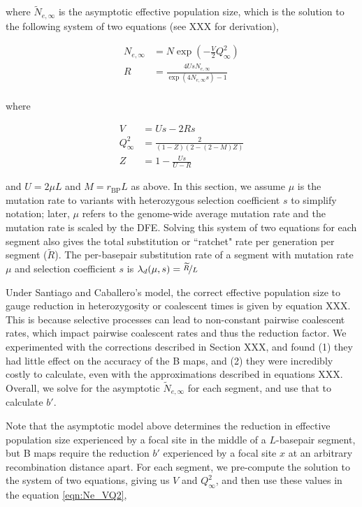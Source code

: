 \documentclass[11pt]{article}
\begin{document}
where $\widetilde{N}_{e,\infty}$ is the asymptotic effective population size,
which is the solution to the following system of two equations (see XXX for
derivation),

\begin{align}
    {N}_{e,\infty} &= N \exp \left( -\frac{V}{2} Q_\infty^2 \right) \label{eqn:Ne_VQ2} \\
  {R} &= \frac{4 U s N_{e,\infty}}{\exp(4 N_{e,\infty} s)-1} \nonumber \\
\end{align}

where 

\begin{align}
  V &= U s - 2 {R} s \\
  Q_\infty^2 &= \frac{2}{(1-Z)(2-(2-M)Z)} \\
  Z &= 1 - \frac{Us}{U-{R}}
\end{align}

and $U = 2\mu L$ and $M = r_\text{BP} L$ as above. In this section, we assume
$\mu$ is the mutation rate to variants with heterozygous selection coefficient
$s$ to simplify notation; later, $\mu$ refers to the genome-wide average
mutation rate and the mutation rate is scaled by the DFE. Solving this system
of two equations for each segment also gives the total substitution or
``ratchet" rate per generation per segment ($\widetilde{R}$). The per-basepair
substitution rate of a segment with mutation rate $\mu$ and selection
coefficient $s$ is $\lambda_d(\mu, s) = \nicefrac{\widetilde{R}}{L}$

Under Santiago and Caballero's model, the correct effective population size to
gauge reduction in heterozygosity or coalescent times is given by equation XXX.
This is because selective processes can lead to non-constant pairwise
coalescent rates, which impact pairwise coalescent rates and thus the reduction
factor. We experimented with the corrections described in Section XXX, and
found (1) they had little effect on the accuracy of the B maps, and (2) they
were incredibly costly to calculate, even with the approximations described in
equations XXX. Overall, we solve for the asymptotic $\widetilde{N}_{e,\infty}$
for each segment, and use that to calculate $b'$.

Note that the asymptotic model above determines the reduction in effective
population size experienced by a focal site in the middle of a $L$-basepair
segment, but B maps require the reduction $b'$ experienced by a focal site $x$
at an arbitrary recombination distance apart. For each segment, we pre-compute
the solution to the system of two equations, giving us $V$ and $Q_\infty^2$,
and then use these values in the equation \eqref{eqn:Ne_VQ2},
\end{document}
